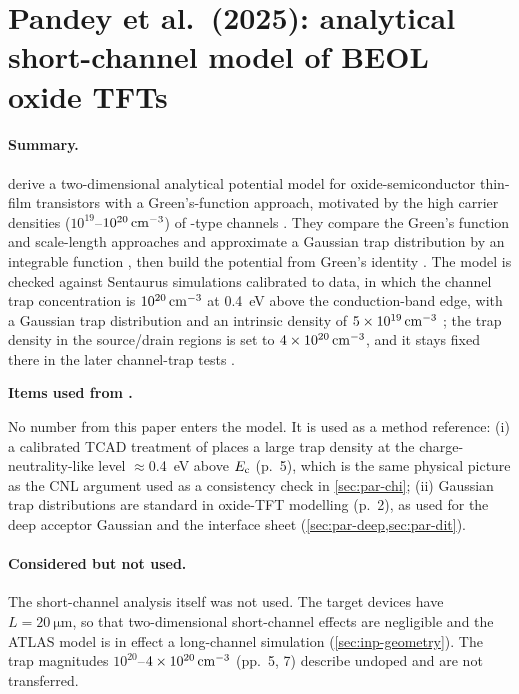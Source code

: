 \section{Pandey et al.\ (2025): analytical short-channel model of BEOL oxide TFTs}
\label{sec:lit-pandey2025}

\paragraph{Summary.}
\citet{Pandey2025} derive a two-dimensional analytical potential model for oxide-semiconductor
thin-film transistors with a Green's-function approach, motivated by the high carrier densities
($10^{19}$--$10^{20}\,\mathrm{cm}^{-3}$) of \InO-type channels \citep[p.~1]{Pandey2025}. They compare the Green's
function and scale-length approaches and approximate a Gaussian trap distribution by an integrable
function \citep[p.~2]{Pandey2025}, then build the potential from Green's identity
\citep[p.~3]{Pandey2025}. The model is checked against Sentaurus simulations calibrated to \InO{}
data, in which the channel trap concentration is $10^{20}\,\mathrm{cm}^{-3}$ at \SI{0.4}{eV} above the conduction-band
edge, with a Gaussian trap distribution and an intrinsic density of $5\times10^{19}\,\mathrm{cm}^{-3}$
\citep[p.~5]{Pandey2025}; the trap density in the source/drain regions is set to $4\times10^{20}\,\mathrm{cm}^{-3}$, and it stays fixed there in the later channel-trap tests
\citep[pp.~5, 7]{Pandey2025}.

\begin{usedbox}
\textbf{Items used from \citet{Pandey2025}.}\par\smallskip
\footnotesize
No number from this paper enters the model. It is used as a method reference: (i) a calibrated TCAD
treatment of \InO{} places a large trap density at the charge-neutrality-like level
$\approx$\SI{0.4}{eV} above $E_{\mathrm{c}}$ (p.~5), which is the same physical picture as the CNL argument used
as a consistency check in \cref{sec:par-chi}; (ii) Gaussian trap distributions are standard in
oxide-TFT modelling (p.~2), as used for the deep acceptor Gaussian and the interface sheet
(\cref{sec:par-deep,sec:par-dit}).
\end{usedbox}

\paragraph{Considered but not used.}
The short-channel analysis itself was not used. The target devices have $L = \SI{20}{\micro\metre}$,
so that two-dimensional short-channel effects are negligible and the ATLAS model is in effect a
long-channel simulation (\cref{sec:inp-geometry}). The trap magnitudes $10^{20}$--$4\times10^{20}\,\mathrm{cm}^{-3}$ (pp.~5, 7)
describe undoped \InO{} and are not transferred.

